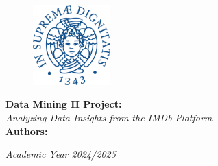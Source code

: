 \documentclass[a4paper,10pt]{article}
\begin{document}
\begin{titlepage}
\setcounter{page}{0} %
\begin{figure}[htp]
\centering
\includegraphics[width=3cm]{cherubino_pant541.pdf} %
\end{figure}

\vspace{2cm} %

\begin{center}
\textbf{\fontsize{18pt}{10pt}\selectfont Data Mining II Project:}\\
\vspace{0.5cm}
\textit{\fontsize{16pt}{10pt}\selectfont Analyzing Data Insights from the IMDb Platform}\\

\vspace{1cm} %
\textbf{Authors:}\\
\vspace{0.3cm}



\vspace{10cm} %
\textit{Academic Year 2024/2025}
\end{center}

\end{titlepage}


\tableofcontents

\clearpage













\end{document}
